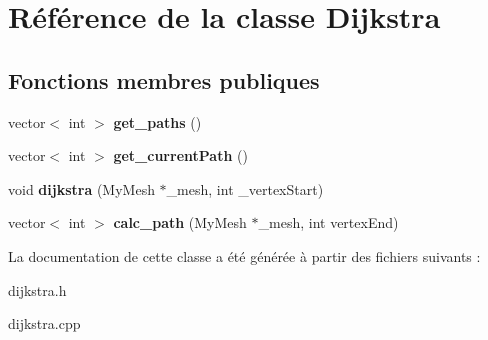 \hypertarget{classDijkstra}{}\section{Référence de la classe Dijkstra}
\label{classDijkstra}
\subsection*{Fonctions membres publiques}
\begin{DoxyCompactItemize}
\item 
\mbox{\label{classDijkstra_a72db9b04b8312339ceef236d1cff0b2e}} 
vector$<$ int $>$ {\bfseries get\+\_\+paths} ()
\item 
\mbox{\label{classDijkstra_a52c514eaceeacf497a1c549abb8f8362}} 
vector$<$ int $>$ {\bfseries get\+\_\+current\+Path} ()
\item 
\mbox{\label{classDijkstra_ac40c109bd288afbb462e776c976b3941}} 
void {\bfseries dijkstra} (My\+Mesh $\ast$\+\_\+mesh, int \+\_\+vertex\+Start)
\item 
\mbox{\label{classDijkstra_a1d9d13e608ed2f5de411679c942638b0}} 
vector$<$ int $>$ {\bfseries calc\+\_\+path} (My\+Mesh $\ast$\+\_\+mesh, int vertex\+End)
\end{DoxyCompactItemize}


La documentation de cette classe a été générée à partir des fichiers suivants \+:\begin{DoxyCompactItemize}
\item 
dijkstra.\+h\item 
dijkstra.\+cpp\end{DoxyCompactItemize}
